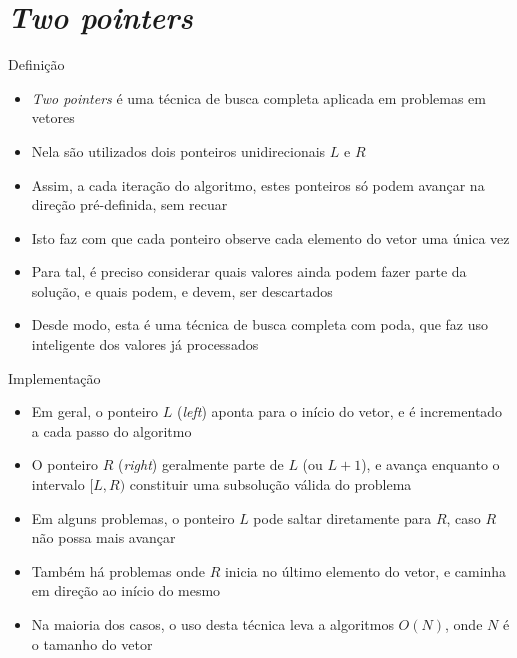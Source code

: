 \section{\it Two pointers}

\begin{frame}[fragile]{Definição}

    \begin{itemize}
        \item \textit{Two pointers} é uma técnica de busca completa aplicada em problemas em
            vetores

        \item Nela são utilizados dois ponteiros unidirecionais $L$ e $R$

        \item Assim, a cada iteração do algoritmo, estes ponteiros só podem avançar na direção
            pré-definida, sem recuar

        \item Isto faz com que cada ponteiro observe cada elemento do vetor uma única vez

        \item Para tal, é preciso considerar quais valores ainda podem fazer parte da solução,
            e quais podem, e devem, ser descartados

        \item Desde modo, esta é uma técnica de busca completa com poda, que faz uso inteligente
            dos valores já processados

    \end{itemize}

\end{frame}

\begin{frame}[fragile]{Implementação}

    \begin{itemize}
        \item Em geral, o ponteiro $L$ (\textit{left}) aponta para o início do vetor, e é incrementado
            a cada passo do algoritmo

        \item O ponteiro $R$ (\textit{right}) geralmente parte de $L$ (ou $L + 1$), e avança enquanto
            o intervalo $[L, R)$ constituir uma subsolução válida do problema

        \item Em alguns problemas, o ponteiro $L$ pode saltar diretamente para $R$, caso $R$ não
            possa mais avançar

        \item Também há problemas onde $R$ inicia no último elemento do vetor, e caminha em direção
            ao início do mesmo

        \item Na maioria dos casos, o uso desta técnica leva a algoritmos $O(N)$, onde $N$ é o tamanho
            do vetor
    \end{itemize}

\end{frame}
